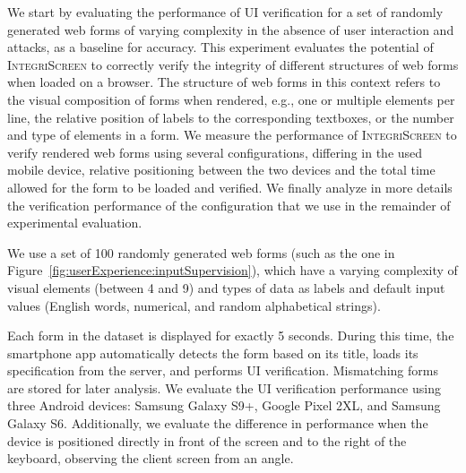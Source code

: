 \documentclass[sigconf, anonymous, balance=false]{acmart}
\newcommand{\app}{smartphone app\xspace}
\newcommand{\myparagraph}[1]{\myparagraphnodot{#1.}}
\newcommand{\myparagraphnodot}[1]{\vspace{4pt} \noindent {\bfseries #1}\xspace}
\newcommand{\updatelater}[1]{#1\xspace}
\newcommand{\numforms}{\updatelater{100}\xspace}
\newcommand{\sysname}{\textsc{IntegriScreen}\xspace}
\begin{document}
We start by evaluating the performance of UI verification for a set of randomly generated web forms of varying complexity in the absence of user interaction and attacks, as a baseline for accuracy. 
This experiment evaluates the potential of \sysname to correctly verify the integrity of different structures of web forms when loaded on a browser. The structure of web forms in this context refers to the visual composition of forms when rendered, e.g., one or multiple elements per line, the relative position of labels to the corresponding textboxes, or the number and type of elements in a form.
We measure the performance of \sysname to verify rendered web forms using several configurations, differing in the used mobile device, relative positioning between the two devices and the total time allowed for the form to be loaded and verified.
We finally analyze in more details the verification performance of the configuration that we use in the remainder of experimental evaluation.



\myparagraph{Setup}
We use a set of \numforms randomly generated web forms (such as the one in Figure~\ref{fig:userExperience:inputSupervision}), which have a varying complexity of visual elements (between 4 and 9) and types of data as labels and default input values (English words, numerical, and random alphabetical strings).


Each form in the dataset is displayed for exactly 5 seconds.
During this time, the \app automatically detects the form based on its title, loads its specification from the server, and performs UI verification.
Mismatching forms are stored for later analysis.
We evaluate the UI verification performance using three Android devices: Samsung Galaxy S9+, Google Pixel 2XL, and Samsung Galaxy S6.
Additionally, we evaluate the difference in performance when the device is positioned directly in front of the screen and to the right of the keyboard, observing the client screen from an angle.
\end{document}
